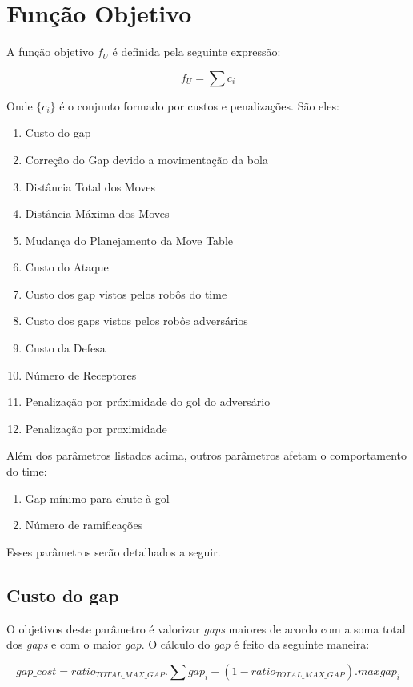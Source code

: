 \section{Função Objetivo}
A função objetivo $f_U$ é definida pela seguinte
expressão:

\begin{dmath}
  f_U = \sum c_i 
\end{dmath}

Onde $\lbrace c_i \rbrace$ é o conjunto formado
por custos e penalizações. São eles:
\begin{enumerate}
  \item Custo do gap
  \item Correção do Gap devido a movimentação da bola
  \item Distância Total dos Moves
  \item Distância Máxima dos Moves 
  \item Mudança do Planejamento da Move Table
  \item Custo do Ataque
  \item Custo dos gap vistos pelos robôs do time
  \item Custo dos gaps vistos pelos robôs adversários
  \item Custo da Defesa
  \item Número de Receptores
  \item Penalização por próximidade do gol do adversário
  \item Penalização por proximidade
\end{enumerate}

Além dos parâmetros listados acima, outros parâmetros
afetam o comportamento do time:
\begin{enumerate}
  \item Gap mínimo para chute à gol
  \item Número de ramificações
\end{enumerate}

Esses parâmetros serão detalhados a seguir.

\subsection{Custo do gap} 
O objetivos deste parâmetro é valorizar \textit{gaps} maiores
de acordo com a soma total dos \textit{gaps} e com o maior \textit{gap}.
O cálculo do \textit{gap} é feito da seguinte maneira:

\begin{dmath} 
 gap{\_}cost = ratio_{TOTAL{\_}MAX{\_}GAP} . \sum gap_i
 + (1 - ratio_{TOTAL{\_}MAX{\_}GAP}) . max{gap_i} 
\end{dmath} 

